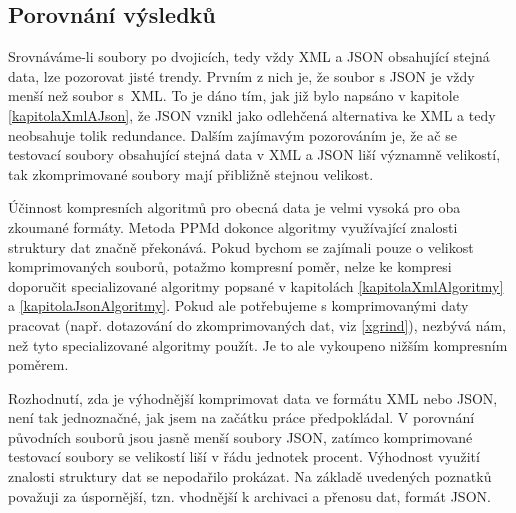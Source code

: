 \subsection{Porovnání výsledků}
Srovnáváme-li soubory po dvojicích, tedy vždy XML a JSON obsahující stejná data, lze pozorovat jisté trendy. Prvním z nich je, že soubor s JSON je vždy menší než soubor s~XML. To je dáno tím, jak již bylo napsáno v kapitole \ref{kapitolaXmlAJson}, že JSON vznikl jako odlehčená alternativa ke XML a tedy neobsahuje tolik redundance. Dalším zajímavým pozorováním je, že ač se testovací soubory obsahující stejná data v XML a JSON liší významně velikostí, tak zkomprimované soubory mají přibližně stejnou velikost.

Účinnost kompresních algoritmů pro obecná data je velmi vysoká pro oba zkoumané formáty. Metoda PPMd dokonce algoritmy využívající znalosti struktury dat značně pře\-ko\-ná\-vá. Pokud bychom se zajímali pouze o velikost komprimovaných souborů, potažmo kompresní poměr, nelze ke kompresi doporučit specializované algoritmy popsané v kapitolách \ref{kapitolaXmlAlgoritmy} a \ref{kapitolaJsonAlgoritmy}. Pokud ale potřebujeme s komprimovanými daty pracovat (např. dotazování do zkomprimovaných dat, viz \ref{xgrind}), nezbývá nám, než tyto specializované algoritmy použít. Je to ale vykoupeno nižším kompresním poměrem.

Rozhodnutí, zda je výhodnější komprimovat data ve formátu XML nebo JSON, není tak jednoznačné, jak jsem na začátku práce předpokládal. V porovnání původních souborů jsou jasně menší soubory JSON, zatímco komprimované testovací soubory se velikostí liší v řádu jednotek procent. Výhodnost využití znalosti struktury dat se nepodařilo prokázat. Na základě uvedených poznatků považuji za úspornější, tzn. vhodnější k archivaci a přenosu dat, formát JSON.